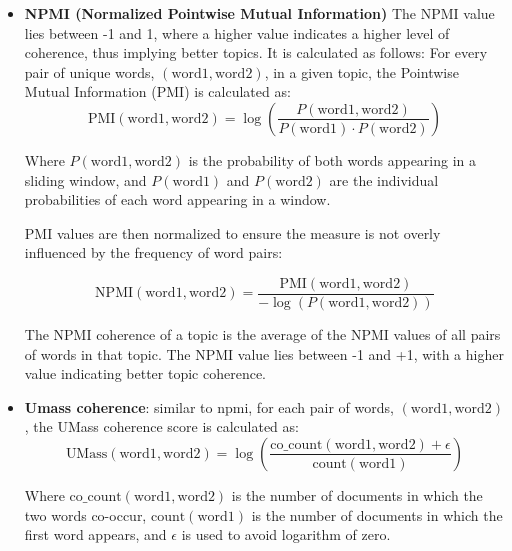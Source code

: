 \begin{itemize}
    \item \textbf{NPMI (Normalized Pointwise Mutual Information)} The NPMI value lies between -1 and 1, where a higher value indicates a higher level of coherence, thus implying better topics. It is calculated as follows: 
    For every pair of unique words, $(\text{{word1}}, \text{{word2}})$, in a given topic, the Pointwise Mutual Information (PMI) is calculated as:
    \begin{equation} 
    \text{{PMI}}(\text{{word1}}, \text{{word2}}) = \log\left(\frac{P(\text{{word1}}, \text{{word2}})}{P(\text{{word1}}) \cdot P(\text{{word2}})} \right)
    \end{equation}
    
    Where $P(\text{{word1}}, \text{{word2}})$ is the probability of both words appearing in a sliding window, and $P(\text{{word1}})$ and $P(\text{{word2}})$ are the individual probabilities of each word appearing in a window.
    
    PMI values are then normalized to ensure the measure is not overly influenced by the frequency of word pairs:
    
    \begin{equation} 
    \text{{NPMI}}(\text{{word1}}, \text{{word2}}) = \frac{\text{{PMI}} (\text{{word1}}, \text{{word2}})}{-\log(P(\text{{word1}}, \text{{word2}}))}
    \end{equation}
    
    The NPMI coherence of a topic is the average of the NPMI values of all pairs of words in that topic. The NPMI value lies between -1 and +1, with a higher value indicating better topic coherence.
    
    
    \item \textbf{Umass coherence}: similar to npmi, 
    for each pair of words, $(\text{{word1}}, \text{{word2}})$, the UMass coherence score is calculated as:
    \begin{equation} 
    \text{{UMass}}(\text{{word1}}, \text{{word2}}) = \log\left(\frac{\text{{co\_count}}(\text{{word1}}, \text{{word2}}) + \epsilon}{\text{{count}}(\text{{word1}})} \right)
    \end{equation}
    
    Where $\text{{co\_count}}(\text{{word1}}, \text{{word2}})$ is the number of documents in which the two words co-occur, $\text{{count}}(\text{{word1}})$ is the number of documents in which the first word appears, and $\epsilon$ is used to avoid logarithm of zero.
    

\end{itemize}
